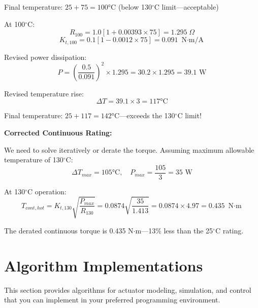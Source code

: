 Final temperature: $25 + 75 = 100°$C (below 130$^\circ$C limit---acceptable)

At 100$^\circ$C:
\begin{equation}
    R_{100} = 1.0[1 + 0.00393 \times 75] = 1.295 \; \Omega
\end{equation}
\begin{equation}
    K_{t,100} = 0.1[1 - 0.0012 \times 75] = 0.091 \text{ N$\cdot$m/A}
\end{equation}

Revised power dissipation:
\begin{equation}
    P = \left(\frac{0.5}{0.091}\right)^2 \times 1.295 = 30.2 \times 1.295 = 39.1 \text{ W}
\end{equation}

Revised temperature rise:
\begin{equation}
    \Delta T = 39.1 \times 3 = 117°\text{C}
\end{equation}

Final temperature: $25 + 117 = 142°$C---exceeds the 130$^\circ$C limit!

\textbf{Corrected Continuous Rating:}

We need to solve iteratively or derate the torque. Assuming maximum allowable temperature of 130$^\circ$C:
\begin{equation}
    \Delta T_{max} = 105°\text{C}, \quad P_{max} = \frac{105}{3} = 35 \text{ W}
\end{equation}

At 130$^\circ$C operation:
\begin{equation}
    T_{cont,hot} = K_{t,130}\sqrt{\frac{P_{max}}{R_{130}}} = 0.0874\sqrt{\frac{35}{1.413}} = 0.0874 \times 4.97 = 0.435 \text{ N$\cdot$m}
\end{equation}

The derated continuous torque is 0.435 N$\cdot$m---13\% less than the 25$^\circ$C rating.

\section{Algorithm Implementations}
\label{sec:actuator_algorithms}

This section provides algorithms for actuator modeling, simulation, and control that you can implement in your preferred programming environment.

